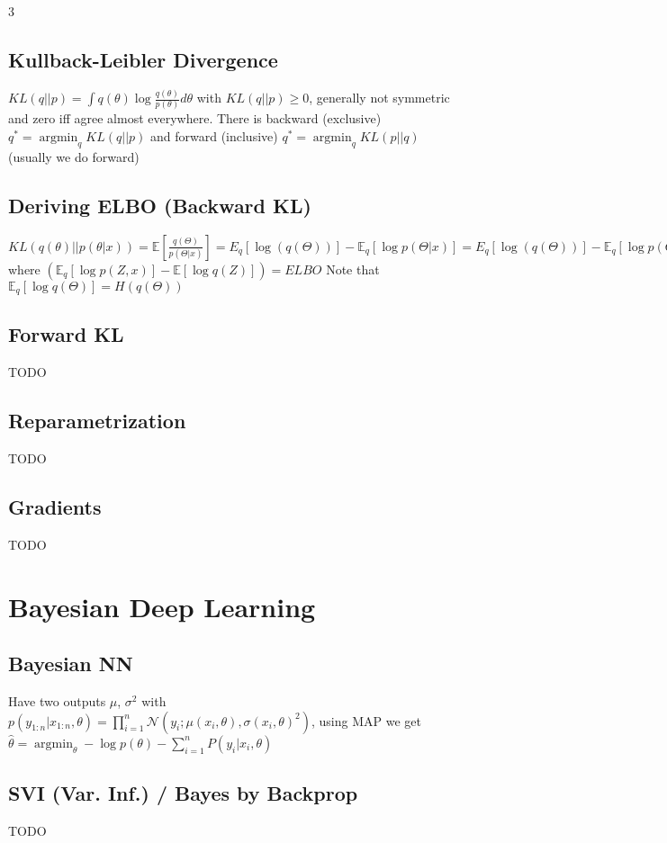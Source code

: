 \documentclass[11pt]{article}
\newcommand{\gauss}{\mathcal{N}}
\newcommand{\argmin}{\operatorname{argmin}}
\newcommand{\E}{\mathbb{E}}
\begin{document}
\begin{multicols*}{3}
	\subsection*{Kullback-Leibler Divergence}
	$KL(q||p) = \int q(\theta) \log \frac{q(\theta)}{p(\theta)} d\theta$ with $KL(q||p) \geq 0$, generally not symmetric and zero iff agree almost everywhere.
	There is backward (exclusive) $q^* = \argmin_q KL(q||p)$ and forward (inclusive) $q^* = \argmin_q KL(p||q)$ (usually we do forward)

	\subsection*{Deriving ELBO (Backward KL)}

$KL(q(\theta)||p(\theta|x)) = \E [\frac{q(\Theta)}{p(\Theta|x)}]=E_q [\log(q(\Theta))] - \E_q [\log p(\Theta|x)] = E_q [\log(q(\Theta))] - \E_q [\log p(\Theta,x)] +\log p(x) = - (\E_q [\log p(Z,x)] - \E [\log q(Z)]) + \log p(x)$ where $(\E_q [\log p(Z,x)] - \E [\log q(Z)]) = ELBO$
Note that $\E_q [\log q(\Theta)] = H(q(\Theta))$

	\subsection*{Forward KL}
TODO

\subsection*{Reparametrization}
TODO
\subsection*{Gradients}
TODO

\section*{Bayesian Deep Learning}

\subsection*{Bayesian NN}
Have two outputs $\mu$, $\sigma^2$ with $p(y_{1:n}|x_{1:n},\theta) = \prod_{i=1}^{n} \gauss(y_i;\mu(x_i,\theta),\sigma(x_i,\theta)^2)$, using MAP we get $\hat{\theta} = \argmin_\theta -\log p(\theta) - \sum_{i=1}^{n} P(y_i|x_i,\theta)$

\subsection*{SVI (Var. Inf.) / Bayes by Backprop}
TODO

\end{multicols*}
\end{document}
